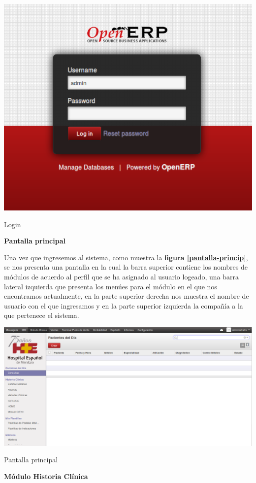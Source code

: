\begin{correccionFigure}[h]
      \centering
      \includegraphics[width=.8\textwidth]{img/tp1/HE/Login}
      \caption{Login}
      \label{login-sistema}
\end{correccionFigure} 


\textbf{Pantalla principal}

Una vez que ingresemos al sistema, como muestra la \textbf{figura \ref{pantalla-princip}}, se nos presenta una pantalla en la cual la barra superior contiene los nombres de módulos de acuerdo al perfil que se ha asignado al usuario logeado, una barra lateral izquierda que presenta los menúes para el módulo en el que nos encontramos actualmente, en la parte superior derecha nos muestra el nombre de usuario con el que ingresamos y en la parte superior izquierda la compañía a la que pertenece el sistema.


\begin{correccionFigure}[h]
      \centering
      \includegraphics[width=.8\textwidth]{img/tp1/HE/PantallaPrincip}
      \caption{Pantalla principal}
      \label{pantalla-princip}
\end{correccionFigure}


\textbf{Módulo Historia Clínica}

